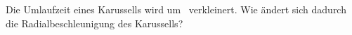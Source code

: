 Die Umlaufzeit eines Karussells wird um \pKaO\ verkleinert. Wie ändert sich dadurch die Radialbeschleunigung des Karussells?
